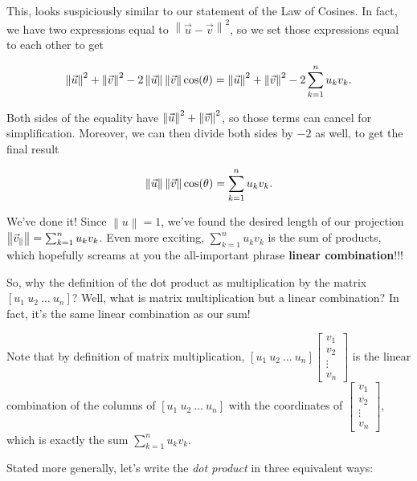 \documentclass{ximera}
\begin{document}
\begin{explanation}
      This, looks suspiciously similar to our statement of the Law of Cosines. In fact, we have two expressions equal to $\left\|\vec{u}-\vec{v}\right\|^2$, so we set those expressions equal to each other to get

      $$\left\|\vec{u}\right\|^2+\left\|\vec{v}\right\|^2-2\left\|\vec{u}\right\|\left\|\vec{v}\right\|\cos(\theta)=\left\|\vec{u}\right\|^2+\left\|\vec{v}\right\|^2-2\sum_{k=1}^nu_kv_k.$$

      Both sides of the equality have $\left\|\vec{u}\right\|^2+\left\|\vec{v}\right\|^2$, so those terms can cancel for simplification. Moreover, we can then divide both sides by $-2$ as well, to get the final result

      $$\left\|\vec{u}\right\|\left\|\vec{v}\right\|\cos(\theta)=\sum_{k=1}^nu_kv_k.$$

      We've done it! Since $\left\|u\right\|=1$, we've found the desired length of our projection $\left\|\vec{v}_\parallel\right\|=\sum_{k=1}^nu_kv_k$. Even more exciting, $\sum_{k=1}^nu_kv_k$ is the sum of products, which hopefully screams at you the all-important phrase {\bf linear combination}!!!

      So, why the definition of the dot product as multiplication by the matrix $[u_1\ u_2\ \ldots\ u_n]$? Well, what is matrix multiplication but a linear combination? In fact, it's the same linear combination as our sum!

      Note that by definition of matrix multiplication, $[u_1\ u_2\ \ldots\ u_n]\begin{bmatrix}
        v_1\\v_2\\\vdots\\v_n
      \end{bmatrix}$ is the linear combination of the columns of $[u_1\ u_2\ \ldots\ u_n]$ with the coordinates of $\begin{bmatrix}
        v_1\\v_2\\\vdots\\v_n
      \end{bmatrix}$, which is exactly the sum $\sum_{k=1}^nu_kv_k$.

     \end{explanation}

    Stated more generally, let's write the \emph{dot product} in three equivalent ways:
\end{document}
